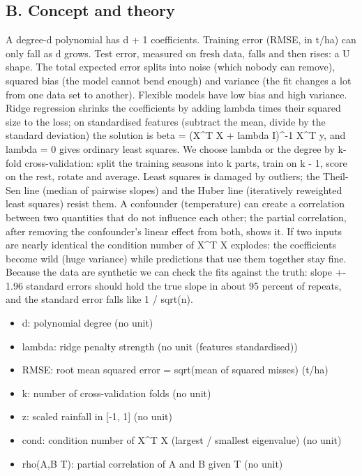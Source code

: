 \documentclass[11pt,a4paper]{article}
\begin{document}
\subsection*{B. Concept and theory}
A degree-d polynomial has d + 1 coefficients. Training error (RMSE, in t/ha) can only fall as d grows. Test error, measured on fresh data, falls and then rises: a U shape. The total expected error splits into noise (which nobody can remove), squared bias (the model cannot bend enough) and variance (the fit changes a lot from one data set to another). Flexible models have low bias and high variance. Ridge regression shrinks the coefficients by adding lambda times their squared size to the loss; on standardised features (subtract the mean, divide by the standard deviation) the solution is beta = (X\textasciicircum{}T X + lambda I)\textasciicircum{}-1 X\textasciicircum{}T y, and lambda = 0 gives ordinary least squares. We choose lambda or the degree by k-fold cross-validation: split the training seasons into k parts, train on k - 1, score on the rest, rotate and average. Least squares is damaged by outliers; the Theil-Sen line (median of pairwise slopes) and the Huber line (iteratively reweighted least squares) resist them. A confounder (temperature) can create a correlation between two quantities that do not influence each other; the partial correlation, after removing the confounder's linear effect from both, shows it. If two inputs are nearly identical the condition number of X\textasciicircum{}T X explodes: the coefficients become wild (huge variance) while predictions that use them together stay fine. Because the data are synthetic we can check the fits against the truth: slope +- 1.96 standard errors should hold the true slope in about 95 percent of repeats, and the standard error falls like 1 / sqrt(n).

\begin{itemize}[nosep]
\item d: polynomial degree (no unit)
\item lambda: ridge penalty strength (no unit (features standardised))
\item RMSE: root mean squared error = sqrt(mean of squared misses) (t/ha)
\item k: number of cross-validation folds (no unit)
\item z: scaled rainfall in [-1, 1] (no unit)
\item cond: condition number of X\textasciicircum{}T X (largest / smallest eigenvalue) (no unit)
\item rho(A,B \textbar{} T): partial correlation of A and B given T (no unit)
\end{itemize}
\end{document}
